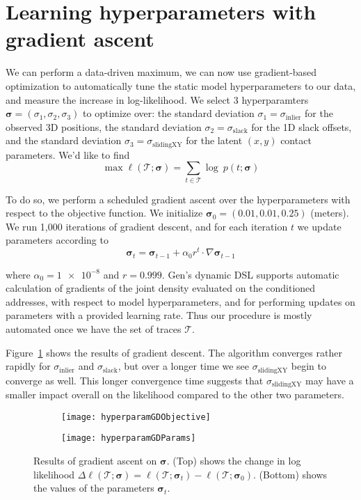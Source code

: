 \section{Learning hyperparameters with gradient ascent}
We can perform a data-driven maximum, we can now use gradient-based optimization to automatically tune the static model hyperparameters to our data, and measure the increase in log-likelihood.
We select 3 hyperparamters $\bm{\sigma} = (\sigma_1, \sigma_2, \sigma_3)$ to optimize over: the standard deviation $\sigma_1 = \sigma_\mathrm{inlier}$ for the observed 3D positions, the standard deviation $\sigma_2 = \sigma_\mathrm{slack}$ for the 1D slack offsets, and the standard deviation $\sigma_3 = \sigma_\mathrm{sliding XY}$ for the latent $(x,y)$ contact parameters.
We'd like to find
\[
  \max \ell(\mathcal{T}; \bm{\sigma}) = \sum_{t \in \mathcal{T}} \log\ p(t; \bm{\sigma})
\]

To do so, we perform a scheduled gradient ascent over the hyperparameters with respect to the objective function.
We initialize $\bm{\sigma}_0 = (0.01, 0.01, 0.25)$ (meters).
We run 1,000 iterations of gradient descent, and for each iteration $t$ we update parameters according to
\[
  \bm{\sigma}_t = \bm{\sigma}_{t-1} + \alpha_0 r^{t} \cdot \nabla\bm{\sigma}_{t-1}
\]

where $\alpha_0 = \num{1e-8}$ and $r = 0.999$.
Gen's dynamic DSL supports automatic calculation of gradients of the joint density evaluated on the conditioned addresses, with respect to model hyperparameters, and for performing updates on parameters with a provided learning rate.
Thus our procedure is mostly automated once we have the set of traces $\mathcal{T}$.

Figure~\ref{fig:hyperparamGD} shows the results of gradient descent.
The algorithm converges rather rapidly for $\sigma_\mathrm{inlier}$ and $\sigma_\mathrm{slack}$, but over a longer time we see $\sigma_\mathrm{sliding XY}$ begin to converge as well.
This longer convergence time suggests that $\sigma_\mathrm{sliding XY}$ may have a smaller impact overall on the likelihood compared to the other two parameters.

\raggedbottom
\pagebreak
\flushbottom

\begin{figure}[H]
  \centering
  \begin{subfigure}[b]{0.75\textwidth}
    \centering
    \texttt{[image: hyperparamGDObjective]}
  \end{subfigure}
  \begin{subfigure}[b]{0.75\textwidth}
    \centering
    \texttt{[image: hyperparamGDParams]}
  \end{subfigure}
  \caption{
    Results of gradient ascent on $\bm{\sigma}$.
    (Top) shows the change in log likelihood $\Delta\ell(\mathcal{T}; \bm{\sigma}) = \ell(\mathcal{T}; \bm{\sigma}_t) - \ell(\mathcal{T}; \bm{\sigma}_0)$.
    (Bottom) shows the values of the parameters $\bm{\sigma}_t$.
  }
  \label{fig:hyperparamGD}
\end{figure}


